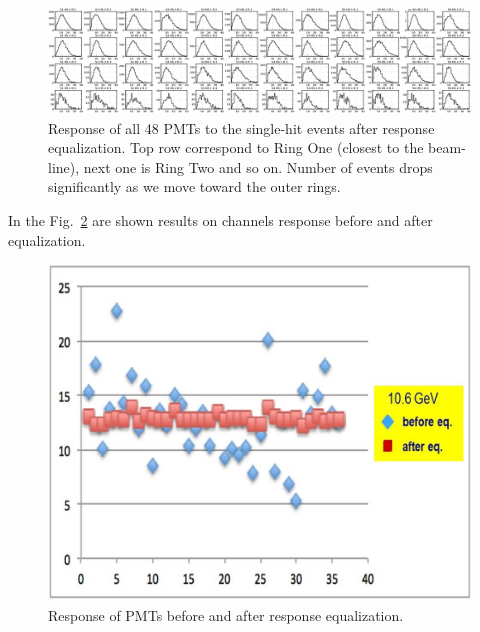 \begin{figure}[ht]
\centering
\includegraphics[width=0.99\linewidth]{images/nphePMT6595.png}
\caption{Response of all 48 PMTs to the single-hit events after response equalization. Top row correspond to Ring One (closest to the beam-line), next one is Ring Two and so on. Number of events drops significantly as we move toward the outer rings.}
\label{fig:htccSinglePmtResponce}
\end{figure}

In the Fig.~\ref{fig:NICK_svodni} are shown results on channels response before and after equalization.

\begin{figure}[ht]
\centering
\includegraphics[width=0.99\linewidth]{images/NICK_svodni.jpg}
\caption{Response of PMTs before and after response equalization.}
\label{fig:NICK_svodni}
\end{figure}

